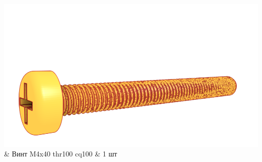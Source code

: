 \documentclass[twoside,a5paper,8pt]{article}
\newlength{\picwidth}
\begin{document}
\begin{longtabu}
\includegraphics[width=\picwidth]{fig/screws/test/crosshead-screw-m4x40-thr100-cq100-orange.png} & Винт M4x40 thr100 cq100 & 1 шт \\



\end{longtabu}
\end{document}
